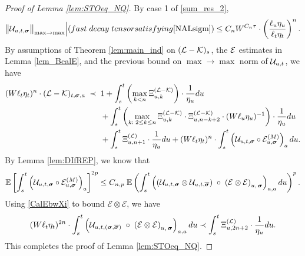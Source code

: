 \documentclass[10pt,reqno]{article}
\theoremstyle{plain} %
\theoremstyle{remark}
\numberwithin{equation}{section}
\begin{document}
\begin{proof}[Proof of Lemma \ref{lem:STOeq_NQ}]
 By  case 1 of \eqref{sum_res_2}, %
$$
\big\|{\cal U}_{u,t,\boldsymbol{\sigma}}\big\|_{\max\to \max}\Big|({\rm fast\; decay \;tensor satisfying \eqref{NALsigm}})\le C_n W^{C_n \tau} \cdot\left(\frac{\ell_u \eta_u}{\ell_t \eta_t}\right)^n.
$$
 By  assumptions of  
 Theorem \ref{lem:main_ind} on  $({\cal L-K})_{s}$, the $\cal E$ estimates in Lemma \ref{lem_BcalE}, and   the previous bound on  $\max\to \max$ norm of ${\cal U}_{u,t}$, 
 we have 
\begin{align}\label{sahwNQ}
  (W\ell_t\eta_t)^n\cdot      (\mathcal{L} - \mathcal{K})_{t, \boldsymbol{\sigma}, \textbf{a}} \;\prec\; \; &
  1+   \int_{s}^t  \left( \max_{k<n }\Xi^{({\cal L-\cal K})}_{u,k}\right) \cdot \frac{1}{\eta_u}   du 
    \nonumber \\
    &+ \int_{s}^t \left( \max_{k:\;2\le k\le n }\Xi^{({\cal L-\cal K})}_{u,k}\cdot \Xi^{({\cal L-\cal K})}_{u,n-k+2}\cdot(W\ell_u\eta_u)^{-1}\right)\cdot \frac{1}{\eta_u} du 
    \nonumber \\
    &+ \int_{s}^t \Xi^{(\cal L)}_{u,n+1}\cdot \frac1{\eta_u} du 
   +
   (W\ell_t\eta_t)^n\cdot\int_{s}^t \left(\mathcal{U}_{u, t, \boldsymbol{\sigma}} \circ    \mathcal{E}^{(M)}_{u, \boldsymbol{\sigma}}\right)_{\textbf{a}} du. 
\end{align}
By Lemma \ref{lem:DIfREP},  we know that 
\begin{equation} \label{sahwNQ2}
   \mathbb{E} \left [    \int_{s}^t \left(\mathcal{U}_{u, t, \boldsymbol{\sigma}} \circ \mathcal{E}^{(M)}_{u, \boldsymbol{\sigma}}\right)_{\textbf{a}} \right ]^{2p} 
   \le C_{n,p} \; 
   \mathbb{E}    \left(\int_{s}^t 
   \left(\left(
   \mathcal{U}_{u, t,  \boldsymbol{\sigma}}
   \otimes 
   \mathcal{U}_{u, t,  \overline{\boldsymbol{\sigma}}}
   \right) \;\circ  \;
   \left( \mathcal{E} \otimes  \mathcal{E} \right)
   _{u, \,\boldsymbol{\sigma}  }
   \right)_{{\textbf a}, {\textbf a}}du 
   \right)^{p}.
\end{equation} 
Using  \eqref{CalEbwXi} to bound $\mathcal{E} \otimes  \mathcal{E}$, we have 
\begin{align}\label{sahwNQ3}
   (W\ell_t\eta_t)^{2n}\cdot  \int_{s}^t  \left(\mathcal{U}_{u, t, (\boldsymbol{\sigma}, \overline{\boldsymbol{\sigma}})} \;\circ  \;
   \left( \mathcal{E} \otimes  \mathcal{E} \right)
   _{u, \,\boldsymbol{\sigma}  }
   \right)_{{\textbf a}, {\textbf a}}du
   \prec \int_{s}^t \Xi^{(\cal L)}_{u, {2n+2}}\cdot \frac{1}{\eta_u}du . 
\end{align}
This completes the proof of Lemma \ref{lem:STOeq_NQ}. 
 
\end{proof}
\end{document}
